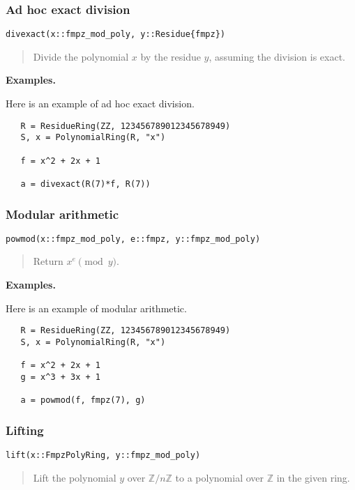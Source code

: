 \documentclass[a4paper,10pt]{article}
\newcommand{\Z}{\mathbb{Z}}
\newcommand{\desc}[1]{\vspace{-3mm}\begin{quote}#1\end{quote}}
\begin{document}
{{\subsubsection{Ad hoc exact division}

\begin{lstlisting}
divexact(x::fmpz_mod_poly, y::Residue{fmpz})
\end{lstlisting}

\desc{Divide the polynomial $x$ by the residue $y$, assuming the division is exact.}

\textbf{Examples.}

Here is an example of ad hoc exact division.

\begin{lstlisting}
   R = ResidueRing(ZZ, 123456789012345678949)
   S, x = PolynomialRing(R, "x")

   f = x^2 + 2x + 1
   
   a = divexact(R(7)*f, R(7)) 
\end{lstlisting}

\subsubsection{Modular arithmetic}

\begin{lstlisting}
powmod(x::fmpz_mod_poly, e::fmpz, y::fmpz_mod_poly)
\end{lstlisting}

\desc{Return $x^e \pmod{y}$.}

\textbf{Examples.}

Here is an example of modular arithmetic.

\begin{lstlisting}
   R = ResidueRing(ZZ, 123456789012345678949)
   S, x = PolynomialRing(R, "x")

   f = x^2 + 2x + 1
   g = x^3 + 3x + 1
   
   a = powmod(f, fmpz(7), g) 
\end{lstlisting}

\subsubsection{Lifting}

\begin{lstlisting}
lift(x::FmpzPolyRing, y::fmpz_mod_poly)
\end{lstlisting}

\desc{Lift the polynomial $y$ over $\Z/n\Z$ to a polynomial over $\Z$ in the given ring.}

}}
\end{document}
